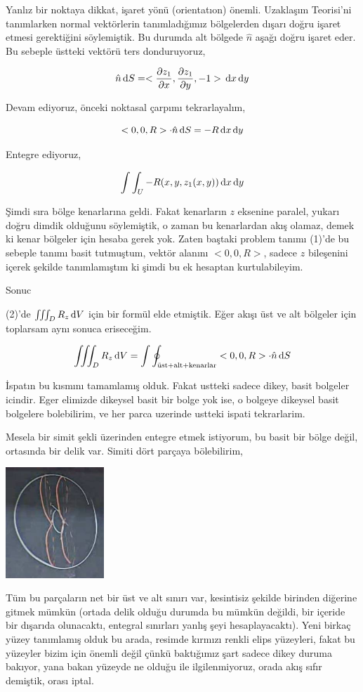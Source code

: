 \documentclass[12pt,fleqn]{article}\usepackage{../../common}
\begin{document}
Yanlız bir noktaya dikkat, işaret yönü (orientatıon) önemli. Uzaklaşım
Teorisi'ni tanımlarken normal vektörlerin tanımladığımız bölgelerden dışarı
doğru işaret etmesi gerektiğini söylemiştik. Bu durumda alt bölgede $\hat{n}$
aşağı doğru işaret eder. Bu sebeple üstteki vektörü ters donduruyoruz,

$$
\hat{n} \,\mathrm{d} S =
<\frac{\partial z_1}{\partial x},
\frac{\partial z_1}{\partial y},
-1 >
\,\mathrm{d} x \,\mathrm{d} y
$$

Devam ediyoruz, önceki noktasal çarpımı tekrarlayalım,

$$
< 0,0,R > \cdot \hat{n} \,\mathrm{d} S = -R \,\mathrm{d} x \,\mathrm{d} y
$$

Entegre ediyoruz,

$$
\int \int_U -R (x,y,z_1(x,y)) \,\mathrm{d} x \,\mathrm{d} y
$$

Şimdi sıra bölge kenarlarına geldi. Fakat kenarların $z$ eksenine paralel,
yukarı doğru dimdik olduğunu söylemiştik, o zaman bu kenarlardan akış olamaz,
demek ki kenar bölgeler için hesaba gerek yok. Zaten baştaki problem tanımı
(1)'de bu sebeple tanımı basit tutmuştum, vektör alanını $< 0,0,R > $,
sadece $z$ bileşenini içerek şekilde tanımlamıştım ki şimdi bu ek hesaptan
kurtulabileyim.

Sonuc

(2)'de $\iiint_D R_z \,\mathrm{d} V$ için bir formül elde etmiştik. Eğer akışı üst
ve alt bölgeler için toplarsam aynı sonuca eriseceğim.

$$
\iiint_D R_z \,\mathrm{d} V = \int \oint_{\textrm{üst+alt+kenarlar}} < 0,0,R >
\cdot \hat{n} \,\mathrm{d} S
$$

İspatın bu kısmını tamamlamış olduk. Fakat ustteki sadece dikey, basit bolgeler
icindir. Eger elimizde dikeysel basit bir bolge yok ise, o bolgeye dikeysel
basit bolgelere bolebilirim, ve her parca uzerinde ustteki ispati tekrarlarim.

Mesela bir simit şekli üzerinden entegre etmek istiyorum, bu basit bir bölge
değil, ortasında bir delik var. Simiti dört parçaya bölebilirim,

\includegraphics[width=10em]{calc_multi_29_03.jpg}

Tüm bu parçaların net bir üst ve alt sınırı var, kesintisiz şekilde birinden
diğerine gitmek mümkün (ortada delik olduğu durumda bu mümkün değildi, bir
içeride bir dışarıda olunacaktı, entegral sınırları yanlış şeyi hesaplayacaktı).
Yeni birkaç yüzey tanımlamış olduk bu arada, resimde kırmızı renkli elips
yüzeyleri, fakat bu yüzeyler bizim için önemli değil çünkü baktığımız şart
sadece dikey duruma bakıyor, yana bakan yüzeyde ne olduğu ile ilgilenmiyoruz,
orada akış sıfır demiştik, orası iptal.
\end{document}
